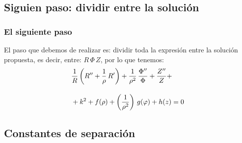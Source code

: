 \documentclass[12pt]{beamer}
\begin{document}
\subsection{Siguien paso: dividir entre la solución}

\begin{frame}
\frametitle{El siguiente paso}
El paso que debemos de realizar es: dividir toda la expresión entre la solución propuesta, es decir, entre: $R \, \Phi \, Z$, por lo que tenemos:
\pause
\begin{align*}
&{} \dfrac{1}{R} \left( {R}^{\prime \prime} + \dfrac{1}{\rho} \, {R}^{\prime} \right) + \dfrac{1}{\rho^{2}} \, \dfrac{{\Phi}^{\prime \prime}}{\Phi} + \dfrac{{Z}^{\prime \prime}}{Z} + \\[1em]
&+ k^{2} + f(\rho) + \left( \dfrac{1}{\rho^{2}} \right) \, g(\varphi) + h(z) = 0    
\end{align*}
\end{frame}

\subsection{Constantes de separación}
\end{document}
